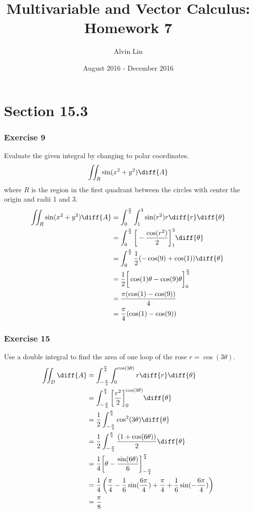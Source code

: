 \documentclass{math}
\title{Multivariable and Vector Calculus: Homework 7}
\author{Alvin Lin}
\date{August 2016 - December 2016}
\begin{document}
\maketitle

\section*{Section 15.3}

\subsubsection*{Exercise 9}
Evaluate the given integral by changing to polar coordinates.
\[ \iint_{R}\sin(x^2+y^2)\diff{A} \]
where \( R \) is the region in the first quadrant between the circles with
center the origin and radii 1 and 3.
\begin{align*}
  \iint_R\sin(x^2+y^2)\diff{A} &=
    \int_{0}^{\frac{\pi}{2}}\int_{1}^{3}\sin(r^2)r\diff{r}\diff{\theta} \\
  &= \int_{0}^{\frac{\pi}{2}}\bigg[-\frac{\cos(r^2)}{2}\bigg]_{1}^{3}
    \diff{\theta} \\
  &= \int_{0}^{\frac{\pi}{2}}\frac{1}{2}(-\cos(9)+\cos(1))\diff{\theta} \\
  &= \frac{1}{2}\bigg[\cos(1)\theta-\cos(9)\theta\bigg]_{0}^{\frac{\pi}{2}} \\
  &= \frac{\pi(\cos(1)-\cos(9))}{4} \\
  &= \frac{\pi}{4}(\cos(1)-\cos(9))
\end{align*}

\subsubsection*{Exercise 15}
Use a double integral to find the area of one loop of the rose
\( r = \cos(3\theta) \).
\begin{align*}
  \iint_{D}\diff{A} &= \int_{-\frac{\pi}{4}}^{\frac{\pi}{4}}
    \int_{0}^{\cos(3\theta)}r\diff{r}\diff{\theta} \\
  &= \int_{-\frac{\pi}{4}}^{\frac{\pi}{4}}
    \bigg[\frac{r^2}{2}\bigg]_{0}^{\cos(3\theta)}\diff{\theta} \\
  &= \frac{1}{2}\int_{-\frac{\pi}{4}}^{\frac{\pi}{4}}
    \cos^2(3\theta)\diff{\theta} \\
  &= \frac{1}{2}\int_{-\frac{\pi}{4}}^{\frac{\pi}{4}}
    \frac{(1+\cos(6\theta))}{2}\diff{\theta} \\
  &= \frac{1}{4}\bigg[
    \theta-\frac{\sin(6\theta)}{6}\bigg]_{-\frac{\pi}{4}}^{\frac{\pi}{4}} \\
  &= \frac{1}{4}\left(\frac{\pi}{4}-\frac{1}{6}\sin(\frac{6\pi}{4})+
    \frac{\pi}{4}+\frac{1}{6}\sin(-\frac{6\pi}{4})\right) \\
  &= \frac{\pi}{8}
\end{align*}
\end{document}
